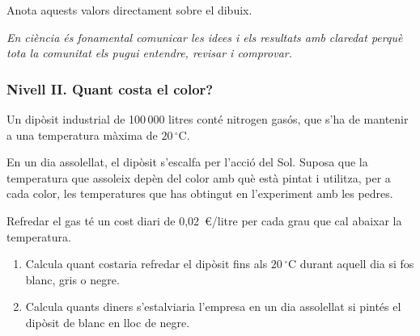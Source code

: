 Anota aquests valors directament sobre el dibuix.

\textit{En ciència és fonamental comunicar les idees i els resultats amb claredat perquè tota la comunitat els pugui entendre, revisar i comprovar.}

\subsubsection{Nivell II. Quant costa el color?}

Un dipòsit industrial de 100\,000 litres conté nitrogen gasós, que s’ha de mantenir a una temperatura màxima de $20\,^\circ$C.

En un dia assolellat, el dipòsit s’escalfa per l’acció del Sol. Suposa que la temperatura que assoleix depèn del color amb què està pintat i utilitza, per a cada color, les temperatures que has obtingut en l’experiment amb les pedres.

Refredar el gas té un cost diari de 0,02~€/litre per cada grau que cal abaixar la temperatura.

\begin{enumerate}[label=\alph*)]
    \item Calcula quant costaria refredar el dipòsit fins als $20\,^\circ$C durant aquell dia si fos blanc, gris o negre.
    
    \item Calcula quants diners s’estalviaria l’empresa en un dia assolellat si pintés el dipòsit de blanc en lloc de negre.
\end{enumerate}

